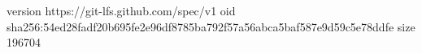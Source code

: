 version https://git-lfs.github.com/spec/v1
oid sha256:54ed28fadf20b695fe2e96df8785ba792f57a56abca5baf587e9d59c5e78ddfe
size 196704
